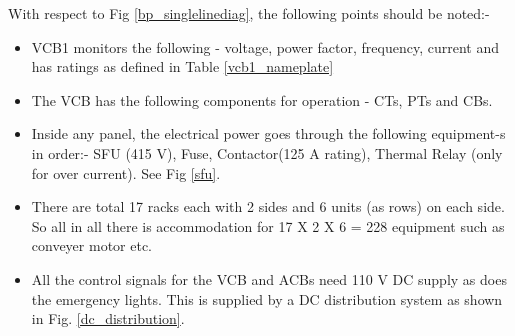 \documentclass{report}
\begin{document}
	With respect to Fig \ref{bp_singlelinediag}, the following points should be noted:-
	\begin{itemize}
		\item VCB1 monitors the following - voltage, power factor, frequency, current and has ratings as defined in Table \ref{vcb1_nameplate}
		\item The VCB has the following components for operation - CTs, PTs and CBs.
		\item Inside any panel, the electrical power goes through the following equipment-s in order:- SFU (415 V), Fuse, Contactor(125 A rating), Thermal Relay (only for over current). See Fig \ref{sfu}.
		\item There are total 17 racks each with 2 sides and 6 units (as rows) on each side. So all in all there is accommodation for 17 X 2 X 6 = 228 equipment such as conveyer motor etc.
		\item All the control signals for the VCB and ACBs need 110 V DC supply as does the emergency lights. This is supplied by a DC distribution system as shown in Fig. \ref{dc_distribution}.
	\end{itemize}
\end{document}
